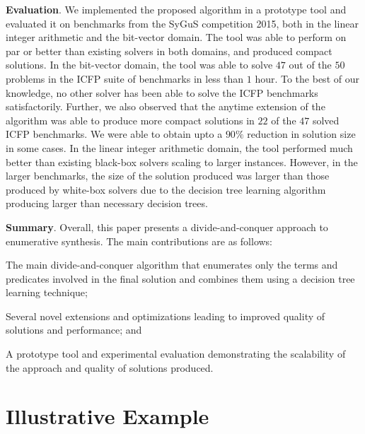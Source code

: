 \documentclass{llncs}
\newcommand{\sygus}{{\sffamily\fontsize{8.5}{10}\selectfont
    SyGuS}\xspace}
\renewcommand{\paragraph}[1]{\par\noindent\textbf{#1}.}
\begin{document}
\paragraph{Evaluation}
We implemented the proposed algorithm in a prototype tool and
evaluated it on benchmarks from the \sygus competition 2015, both in
the linear integer arithmetic and the bit-vector domain.  The tool was
able to perform on par or better than existing solvers in both
domains, and produced compact solutions.  In the bit-vector domain,
the tool was able to solve $47$ out of the $50$ problems in the ICFP
suite of benchmarks in less than $1$ hour.  To the best of our
knowledge, no other solver has been able to solve the ICFP benchmarks
satisfactorily.  Further, we also observed that the anytime extension
of the algorithm was able to produce more compact solutions in $22$ of
the $47$ solved ICFP benchmarks.  We were able to obtain upto a $90\%$
reduction in solution size in some cases.  In the linear integer
arithmetic domain, the tool performed much better than existing
black-box solvers scaling to larger instances.  However, in the larger
benchmarks, the size of the solution produced was larger than those
produced by white-box solvers due to the decision tree learning
algorithm producing larger than necessary decision trees.

\paragraph{Summary}
Overall, this paper presents a divide-and-conquer approach to
enumerative synthesis.
The main contributions are as follows:
\begin{inparaenum}[(a)]
\item The main divide-and-conquer algorithm that enumerates only the
  terms and predicates involved in the final solution and combines them
  using a decision tree learning technique;
\item Several novel extensions and optimizations leading to improved
  quality of solutions and performance; and
\item A prototype tool and experimental evaluation demonstrating the
  scalability of the approach and quality of solutions produced.
\end{inparaenum}

\section{Illustrative Example}
\label{sec:example}
\end{document}
